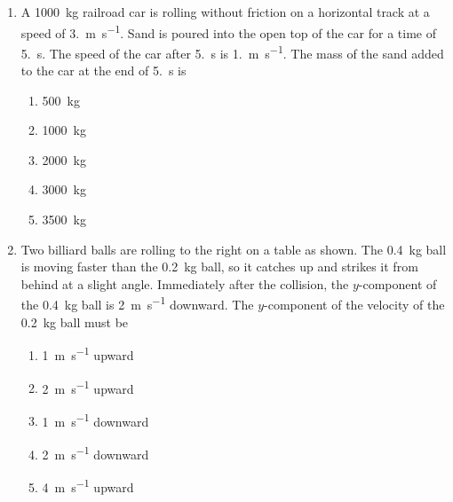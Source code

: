 \documentclass{../../../oss-apphys}
\begin{document}
\begin{multicols}{2}
\begin{enumerate}[leftmargin=18pt]
  \item A \SI{1000}{\kilo\gram} railroad car is rolling without friction on a
    horizontal track at a speed of \SI{3.}{\metre\per\second}. Sand is poured
    into the open top of the car for a time of \SI{5.}{\second}. The speed of
    the car after \SI{5.}{\second} is \SI{1.}{\metre\per\second}. The mass of
    the sand added to the car at the end of \SI{5.}{\second} is
    \begin{center}
    \end{center}
    \begin{enumerate}[nosep,leftmargin=18pt,label=(\Alph*)]
    \item\SI{500 }{\kilo\gram}
    \item\SI{1000}{\kilo\gram}
    \item\SI{2000}{\kilo\gram}
    \item\SI{3000}{\kilo\gram}
    \item\SI{3500}{\kilo\gram}
    \end{enumerate}
    \columnbreak
    
  \item Two billiard balls are rolling to the right on a table as shown. The
    \SI{.4}{\kilo\gram} ball is moving faster than the \SI{.2}{\kilo\gram}
    ball, so it catches up and strikes it from behind at a slight angle.
    Immediately after the collision, the $y$-component of the
    \SI{.4}{\kilo\gram} ball is \SI{2}{\metre\per\second} downward.
    The $y$-component of the velocity of the \SI{.2}{\kilo\gram} ball must be
    \begin{center}
    \end{center}
    \begin{enumerate}[nosep,leftmargin=18pt,label=(\Alph*)]
    \item \SI{1}{\metre\per\second} upward
    \item \SI{2}{\metre\per\second} upward
    \item \SI{1}{\metre\per\second} downward
    \item \SI{2}{\metre\per\second} downward
    \item \SI{4}{\metre\per\second} upward
    \end{enumerate}
  \end{enumerate}
  

\end{multicols}
\end{document}
